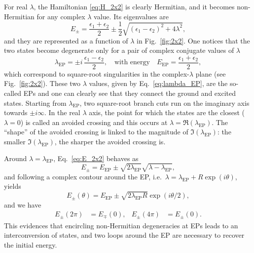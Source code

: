 \documentclass[11pt,a4paper]{article}
\begin{document}
For real $\lambda$, the Hamiltonian \eqref{eq:H_2x2} is clearly Hermitian, and it becomes non-Hermitian for any complex $\lambda$ value.
Its eigenvalues are
\begin{equation}
\label{eq:E_2x2}
	E_{\pm} = \frac{\epsilon_1 + \epsilon_2}{2} \pm \frac{1}{2} \sqrt{(\epsilon_1 - \epsilon_2)^2 + 4\lambda^2},
\end{equation}
and they are represented as a function of $\lambda$ in Fig.~\ref{fig:2x2}.
One notices that the two states become degenerate only for a pair of complex conjugate values of $\lambda$
\begin{equation}
\label{eq:lambda_EP}
	\lambda_\text{EP} = \pm i\,\frac{\epsilon_1 - \epsilon_2}{2},
	\quad
	\text{with energy}	
	\quad
	E_\text{EP} = \frac{\epsilon_1 + \epsilon_2}{2},
\end{equation}
which correspond to square-root singularities in the complex-$\lambda$ plane (see Fig.~\ref{fig:2x2}).
These two $\lambda$ values, given by Eq.~\eqref{eq:lambda_EP}, are the so-called EPs and one can clearly see that they connect the ground and excited states.
Starting from $\lambda_\text{EP}$, two square-root branch cuts run on the imaginary axis towards $\pm i \infty$.
In the real $\lambda$ axis, the point for which the states are the closest ($\lambda = 0$) is called an avoided crossing and this occurs at $\lambda = \Re(\lambda_\text{EP})$.
The ``shape'' of the avoided crossing is linked to the magnitude of $\Im(\lambda_\text{EP})$: the smaller $\Im(\lambda_\text{EP})$, the sharper the avoided crossing is.

Around $\lambda = \lambda_\text{EP}$, Eq.~\eqref{eq:E_2x2} behaves as \cite{MoiseyevBook}
\begin{equation} \label{eq:E_EP}
        E_{\pm} = E_\text{EP} \pm \sqrt{2\lambda_\text{EP}} \sqrt{\lambda - \lambda_\text{EP}},
\end{equation}
and following a complex contour around the EP, i.e.~$\lambda = \lambda_\text{EP} + R \exp(i\theta)$, yields
\begin{equation}
        E_{\pm}(\theta) = E_\text{EP} \pm \sqrt{2\lambda_\text{EP} R}  \exp(i\theta/2),
\end{equation}
and we have
\begin{align}
	E_{\pm}(2\pi) & = E_{\mp}(0),
	&
	E_{\pm}(4\pi) & = E_{\pm}(0).
\end{align}
This evidences that encircling non-Hermitian degeneracies at EPs leads to an interconversion of states, and two loops around the EP are necessary to recover the initial energy.
\end{document}
